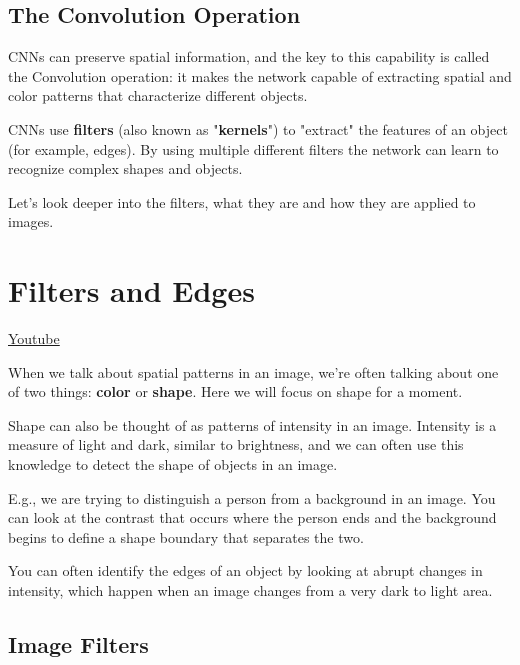 \subsection{The Convolution Operation}

CNNs can preserve spatial information, and the key to this capability is called the Convolution operation: it makes the network capable of extracting spatial and color patterns that characterize different objects. \newline

CNNs use \textbf{filters} (also known as "\textbf{kernels}") to "extract" the features of an object (for example, edges). By using multiple different filters the network can learn to recognize complex shapes and objects. \newline

Let's look deeper into the filters, what they are and how they are applied to images.

\section{Filters and Edges}
\href{https://www.youtube.com/watch?v=hfqNqcEU6uI&t=59s&ab_channel=Udacity}{Youtube} \newline

When we talk about spatial patterns in an image, we're often talking about one of two things: \textbf{color} or \textbf{shape}. Here we will focus on shape for a moment. \newline

Shape can also be thought of as patterns of intensity in an image. Intensity is a measure of light and dark, similar to brightness, and we can often use this knowledge to detect the shape of objects in an image. \newline

E.g., we are trying to distinguish a person from a background in an image. You can look at the contrast that occurs where the person ends and the background begins to define a shape boundary that separates the two. \newline

You can often identify the edges of an object by looking at abrupt changes in intensity, which happen when an image changes from a very dark to light area.

\subsection{Image Filters}

